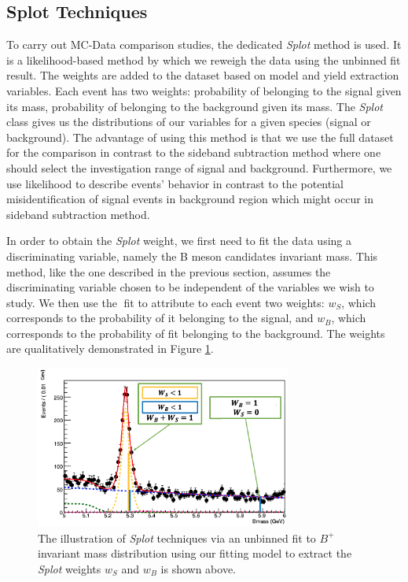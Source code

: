 \subsection{\textbf{Splot} Techniques}

To carry out MC-Data comparison studies, the dedicated \textit{Splot} method is used. It is a likelihood-based method by which we reweigh the data using the unbinned fit result. The weights are added to the dataset based on model and yield extraction variables. Each event has two weights: probability of belonging to the signal given its mass, probability of belonging to the background given its mass. The \textit{Splot} class gives us the distributions of our variables for a given species (signal or background). The advantage of using this method is that we use the full dataset for the comparison in contrast to the sideband subtraction method where one should select the investigation range of signal and background. Furthermore, we use likelihood to describe events' behavior in contrast to the potential misidentification of signal events in background region which might occur in sideband subtraction method. 


In order to obtain the \textit{Splot} weight, we first need to fit the data using a discriminating variable, namely the B meson candidates invariant mass. This method, like the one described in the previous section, assumes the discriminating variable chosen to be independent of the variables we wish to study. We then use the fit to attribute to each event two weights: $w_{S}$, which corresponds to the probability of it belonging to the signal, and $w_B$, which corresponds to the probability of fit belonging to the background. The weights are qualitatively demonstrated in Figure \ref{SplotPic}.


\begin{figure}[h]
\begin{center}
\includegraphics[width=0.75\textwidth]{Figures/Chapter5/SplotWeighPic.png}
\caption{The illustration of \textit{Splot} techniques via an unbinned fit to $B^+$ invariant mass distribution using our fitting model to extract the \textit{Splot} weights $w_S$ and $w_B$ is shown above.}
\label{SplotPic}
\end{center}
\end{figure}



